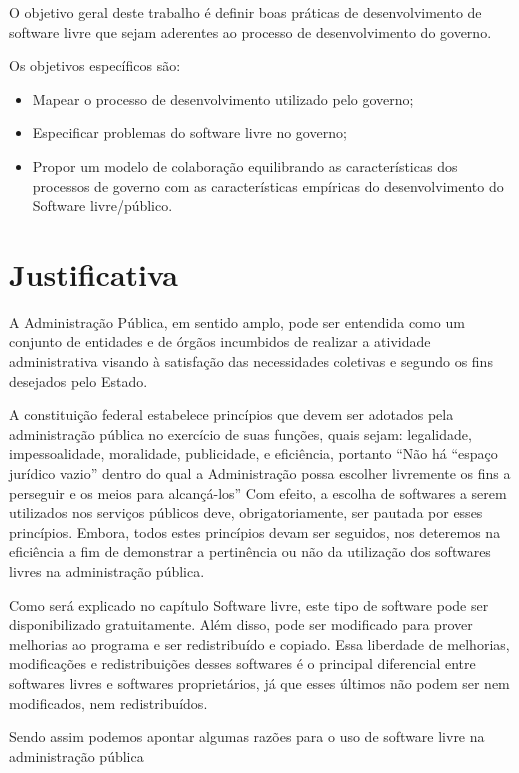 O objetivo geral deste trabalho é definir boas práticas de desenvolvimento de 
software livre que sejam aderentes ao processo de desenvolvimento do governo.

Os objetivos específicos são:

\begin{itemize}
\item Mapear o processo de desenvolvimento utilizado pelo governo;
\item Especificar problemas do software livre no governo;
\item Propor um modelo de colaboração equilibrando as características 
dos processos de governo com as características empíricas do desenvolvimento 
do Software livre/público.
\end{itemize}

\section{Justificativa}

A Administração Pública, em sentido amplo, pode ser entendida como um conjunto 
de entidades e de órgãos incumbidos de realizar a atividade administrativa visando 
à satisfação das necessidades coletivas e segundo os fins desejados pelo Estado.
\cite{coutinho2012uso}

A constituição federal estabelece princípios que devem ser adotados pela administração pública
no exercício de suas funções, quais sejam: legalidade, impessoalidade, moralidade, publicidade, e
eficiência, portanto “Não há “espaço jurídico vazio” dentro do qual a Administração possa escolher
livremente os fins a perseguir e os meios para alcançá-los” 
%
Com efeito, a escolha de softwares a serem utilizados nos serviços públicos deve, obrigatoriamente,
ser pautada por esses princípios. Embora, todos estes princípios devam ser seguidos, nos
deteremos na eficiência a fim de demonstrar a pertinência ou não da utilização dos softwares livres
na administração pública.\cite{coutinho2012uso}

Como será explicado no capítulo Software livre, este tipo de software pode ser disponibilizado
gratuitamente. Além disso, pode ser modificado para prover melhorias ao
programa e ser redistribuído e copiado. Essa liberdade de melhorias, modificações e redistribuições
desses softwares é o principal diferencial entre softwares livres e softwares proprietários, já que
esses últimos não podem ser nem modificados, nem redistribuídos.

Sendo assim podemos apontar algumas razões para o uso de software livre na administração 
pública

